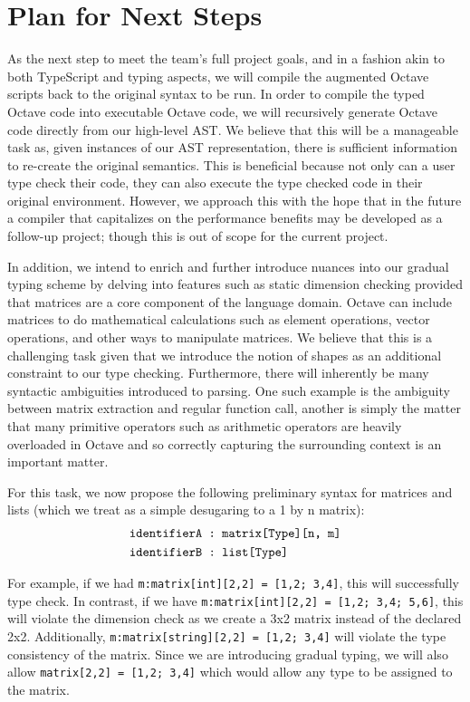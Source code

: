 \section{Plan for Next Steps}
As the next step to meet the team's full project goals, and in a fashion akin to both TypeScript and typing aspects, we will compile the augmented Octave scripts back to the original syntax to be run. In order to compile the typed Octave code into executable Octave code, we will recursively generate Octave code directly from our high-level AST. We believe that this will be a manageable task as, given instances of our AST representation, there is sufficient information to re-create the original semantics. This is beneficial because not only can a user type check their code, they can also execute the type checked code in their original environment. However, we approach this with the hope that in the future a compiler that capitalizes on the performance benefits may be developed as a follow-up project; though this is out of scope for the current project.

In addition, we intend to enrich and further introduce nuances into our gradual typing scheme by delving into features such as static dimension checking provided that matrices are a core component of the language domain. Octave can include matrices to do mathematical calculations such as element operations, vector operations, and other ways to manipulate matrices. We believe that this is a challenging task given that we introduce the notion of shapes as an additional constraint to our type checking. Furthermore, there will inherently be many syntactic ambiguities introduced to parsing. One such example is the ambiguity between matrix extraction and regular function call, another is simply the matter that many primitive operators such as arithmetic operators are heavily overloaded in Octave and so correctly capturing the surrounding context is an important matter.

For this task, we now propose the following preliminary syntax for matrices and lists (which we treat as a simple desugaring to a 1 by n matrix):
\begin{align*}
& \text{\tt identifierA : matrix[Type][n, m]} \\
& \text{\tt identifierB : list[Type]}
\end{align*}

For example, if we had {\tt m:matrix[int][2,2] = [1,2; 3,4]}, this will successfully type check. In contrast, if we have  {\tt m:matrix[int][2,2] = [1,2; 3,4; 5,6]}, this will violate the dimension check as we create a 3x2 matrix instead of the declared 2x2. Additionally, {\tt m:matrix[string][2,2] = [1,2; 3,4]} will violate the type consistency of the matrix. Since we are introducing gradual typing, we will also allow {\tt matrix[2,2] = [1,2; 3,4]} which would allow any type to be assigned to the matrix.

